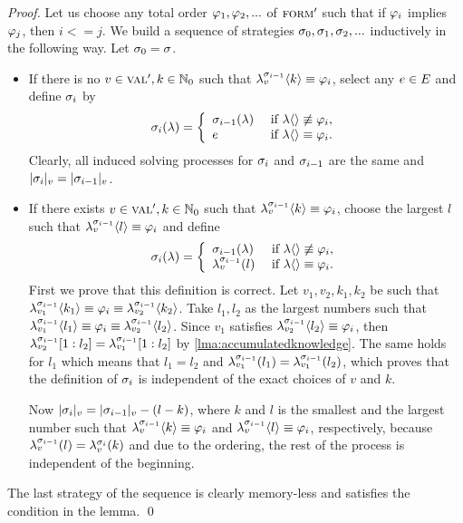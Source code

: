 \begin{proof}
Let us choose any total order $\varphi_1, \varphi_2, ...$ of ${\textsc{form}'}$ such that
  if $\varphi_i$ implies $\varphi_j$, then $i <= j$.
We build a sequence of strategies $\sigma_0, \sigma_1, \sigma_2, ...$ inductively in the following way.
Let $\sigma_0 = \sigma$.
\begin{itemize}
\item If there is no $v\in\textsc{val}', k\in\mathbb{N}_0$ such that
  $\lambda^{\sigma_{i-1}}_{v}\langle k\rangle \equiv \varphi_i$, select any $e\in E$ and
  define $\sigma_i$ by
\[
\sigma_i(\lambda) = \left\{
 \begin{array}{lll}
 \sigma_{i-1}(\lambda)  & \textrm{ if } \lambda\langle\rangle\not\equiv\varphi_i,\\
 e               & \textrm{ if } \lambda\langle\rangle\equiv\varphi_i.
 \end{array}
 \right.
\]
Clearly, all induced solving processes for $\sigma_i$ and $\sigma_{i-1}$ are the same
  and $|\sigma_i|_{v} = |\sigma_{i-1}|_{v}$.

\item If there exists $v\in\textsc{val}', k\in\mathbb{N}_0$ such that
  $\lambda^{\sigma_{i-1}}_{v}\langle k\rangle \equiv \varphi_i$, choose the largest $l$ such that
  $\lambda^{\sigma_{i-1}}_{v}\langle l\rangle \equiv \varphi_i$ and define
\[
\sigma_i(\lambda) = \left\{
 \begin{array}{lll}
 \sigma_{i-1}(\lambda)            & \textrm{ if } \lambda\langle\rangle\not\equiv\varphi_i,\\
 \lambda^{\sigma_{i-1}}_{v}(l)   & \textrm{ if } \lambda\langle\rangle\equiv\varphi_i.
 \end{array}
 \right.
\]
First we prove that this definition is correct.
Let $v_1, v_2, k_1, k_2$ be such that
  $\lambda^{\sigma_{i-1}}_{v_1}\langle k_1\rangle\equiv\varphi_i\equiv\lambda^{\sigma_{i-1}}_{v_2}\langle k_2\rangle$.
Take $l_1, l_2$ as the largest numbers such that
  $\lambda^{\sigma_{i-1}}_{v_1}\langle l_1\rangle\equiv\varphi_i\equiv\lambda^{\sigma_{i-1}}_{v_2}\langle l_2\rangle$.
Since $v_1$ satisfies $\lambda^{\sigma_{i-1}}_{v_2}\langle l_2\rangle\equiv\varphi_i$,
  then $\lambda^{\sigma_{i-1}}_{v_2}[1:l_2] = \lambda^{\sigma_{i-1}}_{v_1}[1:l_2]$
  by \autoref{lma:accumulatedknowledge}.
The same holds for $l_1$ which means that $l_1 = l_2$ and
  $\lambda^{\sigma_{i-1}}_{v_1}(l_1) = \lambda^{\sigma_{i-1}}_{v_1}(l_2)$, which
  proves that the definition of $\sigma_i$ is independent of the exact choices
  of $v$ and $k$.

Now $|\sigma_i|_{v} = |\sigma_{i-1}|_{v} - (l-k)$, where
  $k$ and $l$ is the smallest and the largest number such that
  $\lambda^{\sigma_{i-1}}_{v}\langle k\rangle\equiv\varphi_i $ and
  $\lambda^{\sigma_{i-1}}_{v}\langle l\rangle\equiv\varphi_i $, respectively,
  because
  $\lambda^{\sigma_{i-1}}_{v}(l) = \lambda^{\sigma_{i}}_{v}(k)$ and due to the ordering,
  the rest of the process is independent of the beginning.
\end{itemize}

The last strategy of the sequence is clearly memory-less and satisfies the
  condition in the lemma. \qed
\end{proof}

